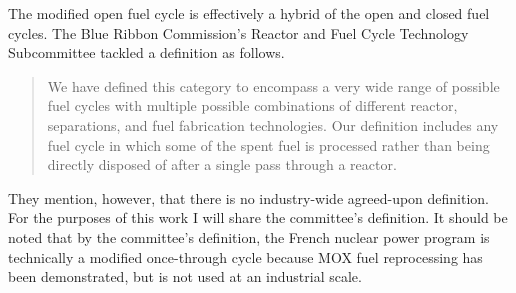 The modified open fuel cycle is effectively a hybrid of the open and closed fuel
cycles. The Blue Ribbon Commission's Reactor and Fuel Cycle
Technology Subcommittee tackled a definition as follows. 

\begin{quotation}
We have defined this category to encompass a very wide range of possible fuel
cycles with multiple possible combinations of different reactor, separations,
and fuel fabrication technologies. Our definition includes any fuel cycle in
which some of the spent fuel is processed rather than being directly disposed of
after a single pass through a reactor.~\cite{brc_reactor_2012}
\end{quotation}

They mention, however, that there is no industry-wide agreed-upon
definition. For the purposes of this work I will share the committee's
definition. It should be noted that by the committee's definition, the French
nuclear power program is technically a modified once-through cycle because MOX
fuel reprocessing has been demonstrated, but is not used at an industrial scale.
